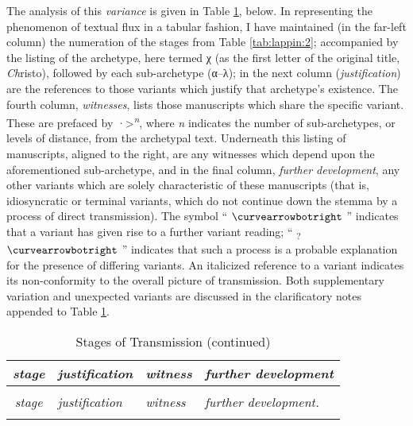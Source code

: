 \begin{paper}
\noindent The analysis of this \emph{variance} is given in Table \ref{tab:lappin:4}, below. In
representing the phenomenon of textual flux in a tabular fashion, I have
maintained (in the far-left column) the numeration of the stages from
Table \ref{tab:lappin:2}; accompanied by the listing of the archetype, here termed χ (as
the first letter of the original title, \emph{Ch}risto), followed by
each sub-archetype (α--λ); in the next column (\emph{justification}) are
the references to those variants which justify that archetype's
existence. The fourth column, \emph{witnesses}, lists those manuscripts
which share the specific variant. These are prefaced by
·\textgreater{}\textsuperscript{\emph{n}}, where \emph{n} indicates the
number of sub-archetypes, or levels of distance, from the archetypal
text. Underneath this listing of manuscripts, aligned to the right, are
any witnesses which depend upon the aforementioned sub-archetype, and in
the final column, \emph{further development}, any other variants which
are solely characteristic of these manuscripts (that is, idiosyncratic
or terminal variants, which do not continue down the stemma by a process
of direct transmission). The symbol `` $\curvearrowbotright$ '' indicates that a variant has
given rise to a further variant reading; `` \textsubscript{?}$\curvearrowbotright$ ''
indicates that such a process is a probable explanation for the presence
of differing variants. An italicized reference to a variant indicates
its non-conformity to the overall picture of transmission. Both
supplementary variation and unexpected variants are discussed in the
clarificatory notes appended to Table \ref{tab:lappin:4}.

\begin{center}
\centering\scriptsize\renewcommand{\arraystretch}{2}
\begin{longtable}[]{@{}p{}p{}p{}p{}p{}@{}}
\caption{Stages of Transmission\label{tab:lappin:4}} \\
\toprule
\multicolumn{2}{c}{\emph{stage}} & \emph{justification} & \emph{witness} &
\emph{further development}\\
\midrule
\endfirsthead

\caption{Stages of Transmission (continued)} \\
\toprule
\multicolumn{2}{c}{\emph{stage}} & \emph{justification} & \emph{witness} &
\emph{further development.}\\
\midrule
\endhead

\bottomrule
\endfoot


\end{longtable}
\end{center}
\end{paper}
